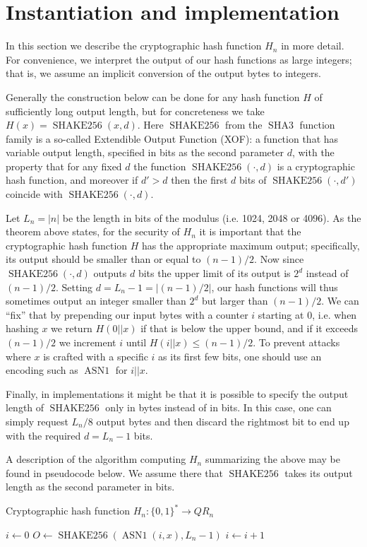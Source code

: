 \documentclass[a4paper,12pt]{article}
\DeclareMathOperator{\shake}{SHAKE256}
\DeclareMathOperator{\asn}{ASN1}
\DeclareMathOperator{\sha}{SHA3}
\begin{document}
\section{Instantiation and implementation}
In this section we describe the cryptographic hash function $H_n$ in more detail. For convenience, we interpret the output of our hash functions as large integers; that is, we assume an implicit conversion of the output bytes to integers.

Generally the construction below can be done for any hash function $H$ of sufficiently long output length, but for concreteness we take $H(x) = \shake(x, d)$. Here $\shake$ from the $\sha$ function family is a so-called Extendible Output Function (XOF): a function that has variable output length, specified in bits as the second parameter $d$, with the property that for any fixed $d$ the function $\shake(\cdot, d)$ is a cryptographic hash function, and moreover if $d' > d$ then the first $d$ bits of $\shake(\cdot, d')$ coincide with $\shake(\cdot, d)$.

Let $L_n = |n|$ be the length in bits of the modulus (i.e. 1024, 2048 or 4096). As the theorem above states, for the security of $H_n$ it is important that the cryptographic hash function $H$ has the appropriate maximum output; specifically, its output should be smaller than or equal to $(n-1)/2$. Now since $\shake(\cdot, d)$ outputs $d$ bits the upper limit of its output is $2^d$ instead of $(n-1)/2$. Setting $d = L_n-1 = |(n-1)/2|$, our hash functions will thus sometimes output an integer smaller than $2^d$ but larger than $(n-1)/2$. We can ``fix'' that by prepending our input bytes with a counter $i$ starting at 0, i.e. when hashing $x$ we return $H(0 || x)$ if that is below the upper bound, and if it exceeds $(n-1)/2$ we increment $i$ until $H(i || x) \leq (n-1)/2$. To prevent attacks where $x$ is crafted with a specific $i$ as its first few bits, one should use an encoding such as $\asn$ for $i || x$.

Finally, in implementations it might be that it is possible to specify the output length of $\shake$ only in bytes instead of in bits. In this case, one can simply request $L_n/8$ output bytes and then discard the rightmost bit to end up with the required $d = L_n-1$ bits.

A description of the algorithm computing $H_n$ summarizing the above may be found in pseudocode below. We assume there that $\shake$ takes its output length as the second parameter in bits.

\begin{algorithm}
  \caption{Cryptographic hash function $H_n : \{0,1\}^* \to QR_n$}
  \begin{algorithmic}
      \State $i \gets 0$
      \Repeat
        \State $O \gets \shake(\asn(i, x), L_n-1)$
        \State $i \gets i + 1$
      \State {}
    \EndFunction
  \end{algorithmic}
\end{algorithm}
\end{document}
